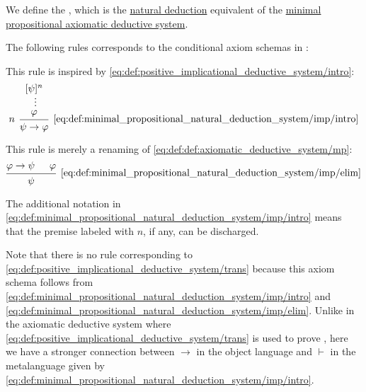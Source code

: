 \begin{definition}\label{def:minimal_propositional_natural_deduction_system}
  We define the , which is the \hyperref[def:natural_deduction_system]{natural deduction} equivalent of the \hyperref[def:minimal_propositional_axiomatic_deductive_system]{minimal propositional axiomatic deductive system}.

  \begin{thmenum}
     The following rules corresponds to the conditional axiom schemas in :

    \begin{minipage}[t]{0.45\textwidth}
      This rule is inspired by \eqref{eq:def:positive_implicational_deductive_system/intro}:
      \begin{equation*}\taglabel[\( \rightarrow^+ \)]{eq:def:minimal_propositional_natural_deduction_system/imp/intro}
        \begin{prooftree}
          \hypo{ [\psi]^n }
          \ellipsis {} { \varphi }
          \infer[left label=\( n \)]1[\ref{eq:def:minimal_propositional_natural_deduction_system/imp/intro}]{ \psi \rightarrow \varphi }
        \end{prooftree}
      \end{equation*}
    \end{minipage}
    \hfill
    \begin{minipage}[t]{0.45\textwidth}
      This rule is merely a renaming of \eqref{eq:def:def:axiomatic_deductive_system/mp}:
      \begin{equation*}\taglabel[\( \rightarrow^- \)]{eq:def:minimal_propositional_natural_deduction_system/imp/elim}
        \begin{prooftree}
          \hypo{ \varphi \rightarrow \psi }
          \hypo{ \varphi }
          \infer2[\ref{eq:def:minimal_propositional_natural_deduction_system/imp/elim}]{ \psi }
        \end{prooftree}
      \end{equation*}
    \end{minipage}

    The additional notation in \eqref{eq:def:minimal_propositional_natural_deduction_system/imp/intro} means that the premise labeled with \( n \), if any, can be discharged.

    Note that there is no rule corresponding to \eqref{eq:def:positive_implicational_deductive_system/trans} because this axiom schema follows from \eqref{eq:def:minimal_propositional_natural_deduction_system/imp/intro} and \eqref{eq:def:minimal_propositional_natural_deduction_system/imp/elim}. Unlike in the axiomatic deductive system where \eqref{eq:def:positive_implicational_deductive_system/trans} is used to prove , here we have a stronger connection between \( \rightarrow \) in the object language and \( \vdash \) in the metalanguage given by \eqref{eq:def:minimal_propositional_natural_deduction_system/imp/intro}.


\end{thmenum}
\end{definition}
